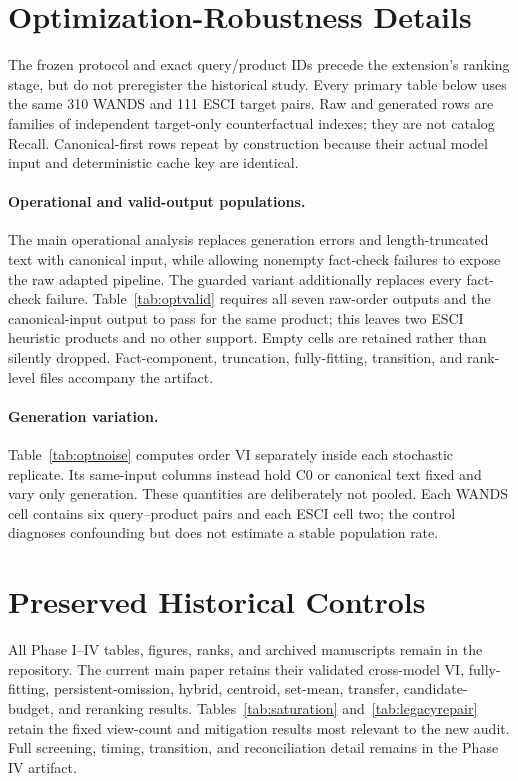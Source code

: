 \appendix
\section{Optimization-Robustness Details}
The frozen protocol and exact query/product IDs precede the extension's ranking stage, but do not preregister the historical study. Every primary table below uses the same 310 WANDS and 111 ESCI target pairs. Raw and generated rows are families of independent target-only counterfactual indexes; they are not catalog Recall. Canonical-first rows repeat by construction because their actual model input and deterministic cache key are identical.







\paragraph{Operational and valid-output populations.}
The main operational analysis replaces generation errors and length-truncated text with canonical input, while allowing nonempty fact-check failures to expose the raw adapted pipeline. The guarded variant additionally replaces every fact-check failure. Table~\ref{tab:optvalid} requires all seven raw-order outputs and the canonical-input output to pass for the same product; this leaves two ESCI heuristic products and no other support. Empty cells are retained rather than silently dropped. Fact-component, truncation, fully-fitting, transition, and rank-level files accompany the artifact.

\paragraph{Generation variation.}
Table~\ref{tab:optnoise} computes order VI separately inside each stochastic replicate. Its same-input columns instead hold C0 or canonical text fixed and vary only generation. These quantities are deliberately not pooled. Each WANDS cell contains six query--product pairs and each ESCI cell two; the control diagnoses confounding but does not estimate a stable population rate.

\section{Preserved Historical Controls}
All Phase I--IV tables, figures, ranks, and archived manuscripts remain in the repository. The current main paper retains their validated cross-model VI, fully-fitting, persistent-omission, hybrid, centroid, set-mean, transfer, candidate-budget, and reranking results. Tables~\ref{tab:saturation} and~\ref{tab:legacyrepair} retain the fixed view-count and mitigation results most relevant to the new audit. Full screening, timing, transition, and reconciliation detail remains in the Phase IV artifact.

